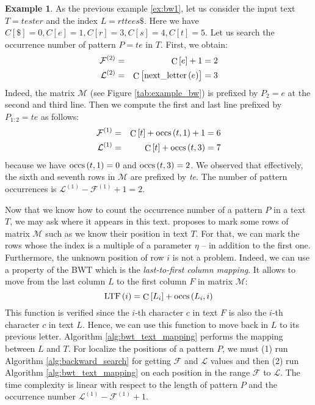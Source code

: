 \documentclass[11pt,twoside]{article}
\theoremstyle{definition}
\newtheorem{example}{Example}
\def\func#1{\mathop{\rm #1}}
\def\first{\mathcal{F}}
\def\last{\mathcal{L}}
\def\counts{\func{C}\nolimits}
\def\occs{\func{occs}\nolimits}
\def\next{\func{next\_letter}\nolimits}
\def\ltf{\func{LTF}\nolimits}
\begin{document}
\begin{example}\label{ex:bw2}
As the previous example \ref{ex:bw1}, let us consider the input text $T = \textit{tester}$ and the index $L = \textit{rttees\$}$. Here we have $C[\$] = 0, C[e] = 1, C[r] = 3, C[s] = 4, C[t] = 5$. Let us search the occurrence number of pattern $P = \textit{te}$ in $T$. First, we obtain:
\begin{eqnarray*}
\first^{\left(2\right)} &=& \counts\left[e\right] + 1 = 2 \\ \last^{\left(2\right)} &=& \counts\left[\next\left(e\right)\right] = 3
\end{eqnarray*}
Indeed, the matrix $\mathcal{M}$ (see Figure \ref{tab:example_bw}) is prefixed by $P_{2} = \textit{e}$ at the second and third line. Then we compute the first and last line prefixed by $P_{1:2} = \textit{te}$ as follows:
\begin{eqnarray*}
\first^{\left(1\right)} &=& \counts\left[t\right] + \occs\left(t, 1\right) + 1 = 6 \\
\last^{\left(1\right)} &=& \counts\left[t\right] + \occs\left(t, 3\right) = 7
\end{eqnarray*}
because we have $\occs\left(t, 1\right) = 0$ and $\occs\left(t, 3\right) = 2$. We observed that effectively, the sixth and seventh rows in $\mathcal{M}$ are prefixed by \textit{te}. The number of pattern occurrences is $\last^{\left(1\right)} - \first^{\left(1\right)} + 1 = 2$.
\end{example}

Now that we know how to count the occurrence number of a pattern $P$ in a text $T$, we may ask where it appears in this text. \citet{Ferragina-2005} proposes to mark some rows of matrix $\mathcal{M}$ such as we know their position in text $T$. For that, we can mark the rows whose the index is a multiple of a parameter $\eta$ -- in addition to the first one. Furthermore, the unknown position of row $i$ is not a problem. Indeed, we can use a property of the BWT which is the \textit{last-to-first column mapping}. It allows to move from the last column $L$ to the first column $F$ in matrix $\mathcal{M}$:
\begin{equation*}
\ltf\left(i\right) = \counts\left[L_{i}\right] + \occs\left(L_{i}, i\right)
\end{equation*}
This function is verified since the $i$-th character $c$ in text $F$ is also the $i$-th character $c$ in text $L$. Hence, we can use this function to move back in $L$ to its previous letter. Algorithm \ref{alg:bwt_text_mapping} performs the mapping between $L$ and $T$. For localize the positions of a pattern $P$, we must (1) run Algorithm \ref{alg:backward_search} for getting $\first$ and $\last$ values and then (2) run Algorithm \ref{alg:bwt_text_mapping} on each position in the range $\first$ to $\last$. The time complexity is linear with respect to the length of pattern $P$ and the occurrence number $\last^{\left(1\right)} - \first^{\left(1\right)} + 1$.
\end{document}
